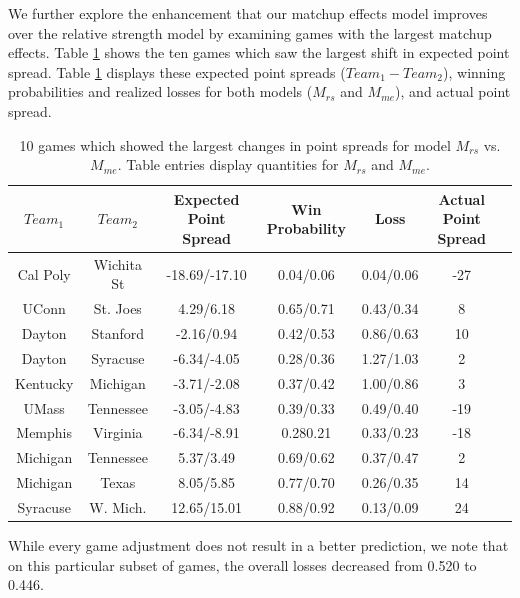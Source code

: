 \documentclass[letterpaper,12pt]{article}
\begin{document}
We further explore the enhancement that our matchup effects model improves over the relative strength model by examining games with the largest matchup effects. Table \ref{tab:change} shows the ten games which saw the largest shift in expected point spread. Table \ref{tab:change} displays these expected point spreads ($Team_1 - Team_2$), winning probabilities and realized losses for both models ($M_{rs}$ and $M_{me}$), and actual point spread. 
\begin{table}[h!]
\caption{10 games which showed the largest changes in point spreads for model $M_{rs}$ vs. $M_{me}$. Table entries display quantities for $M_{rs}$ and $M_{me}$.\label{tab:change}}
\scriptsize
\centering
\begin{tabular}{|cc | ccc |c|c|}
  \hline
  \hline
 $Team_1$ & $Team_2$ & Expected Point Spread & Win Probability & Loss & Actual Point Spread\\ 
  \hline
 Cal Poly & Wichita St & -18.69/-17.10  & 0.04/0.06 & 0.04/0.06&  -27\\ 
 UConn & St. Joes &4.29/6.18 & 0.65/0.71 & 0.43/0.34  & 8\\ 
 Dayton & Stanford & -2.16/0.94 & 0.42/0.53 & 0.86/0.63& 10 \\ 
 Dayton & Syracuse & -6.34/-4.05 & 0.28/0.36 & 1.27/1.03& 2\\ 
 Kentucky & Michigan & -3.71/-2.08 & 0.37/0.42 & 1.00/0.86 & 3\\ 
 UMass & Tennessee &-3.05/-4.83 & 0.39/0.33 & 0.49/0.40 & -19\\ 
 Memphis & Virginia & -6.34/-8.91 & 0.280.21 & 0.33/0.23 & -18\\ 
 Michigan & Tennessee & 5.37/3.49 & 0.69/0.62 & 0.37/0.47 & 2\\ 
 Michigan & Texas & 8.05/5.85 & 0.77/0.70 & 0.26/0.35 & 14\\ 
 Syracuse & W. Mich. & 12.65/15.01 & 0.88/0.92 & 0.13/0.09& 24\\ 
   \hline
   \hline
\end{tabular}
\end{table}
While every game adjustment does not result in a better prediction,  we note that on this particular subset of games, the overall losses decreased from 0.520 to 0.446. 
\end{document}
